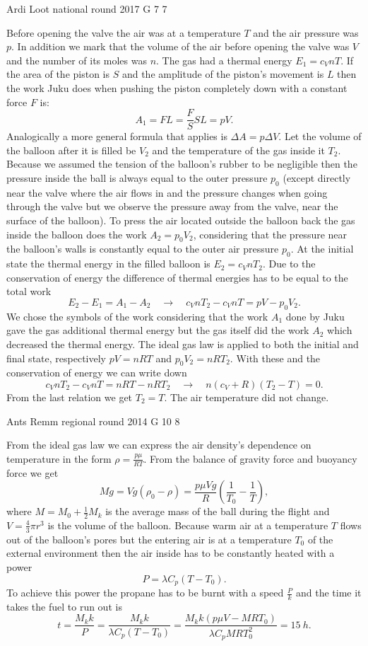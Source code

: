 \documentclass[11pt]{article}
\begin{document}
{Ardi Loot} %
{national round} %
{2017} %
{G 7} %
{7} %
{

\ifEngSolution
Before opening the valve the air was at a temperature $T$ and the air pressure was $p$. In addition we mark that the volume of the air before opening the valve was $V$ and the number of its moles was $n$. The gas had a thermal energy $E_1=c_VnT$. If the area of the piston is $S$ and the amplitude of the piston’s movement is $L$ then the work Juku does when pushing the piston completely down with a constant force $F$ is:
$$A_1=FL=\frac{F}{S}SL=pV.$$ 
Analogically a more general formula that applies is $\Delta A = p \Delta V$. Let the volume of the balloon after it is filled be $V_2$ and the temperature of the gas inside it $T_2$. Because we assumed the tension of the balloon’s rubber to be negligible then the pressure inside the ball is always equal to the outer pressure $p_0$ (except directly near the valve where the air flows in and the pressure changes when going through the valve but we observe the pressure away from the valve, near the surface of the balloon). To press the air located outside the balloon back the gas inside the balloon does the work $A_2=p_0V_2$, considering that the pressure near the balloon’s walls is constantly equal to the outer air pressure $p_0$. At the initial state the thermal energy in the filled balloon is $E_2=c_VnT_2$. Due to the conservation of energy the difference of thermal energies has to be equal to the total work
$$E_2-E_1 = A_1-A_2 \quad\rightarrow\quad c_VnT_2-c_VnT = pV - p_0V_2.$$ 
We chose the symbols of the work considering that the work $A_1$ done by Juku gave the gas additional thermal energy but the gas itself did the work $A_2$ which decreased the thermal energy. The ideal gas law is applied to both the initial and final state, respectively $pV=nRT$ and $p_0V_2=nRT_2$. With these and the conservation of energy we can write down
$$c_VnT_2-c_VnT = nRT-nRT_2 \quad\rightarrow\quad n(c_V+R)(T_2-T)=0.$$ 
From the last relation we get $T_2=T$. The air temperature did not change.
\fi
}

{Ants Remm} %
{regional round} %
{2014} %
{G 10} %
{8} %
{

\ifEngSolution
From the ideal gas law we can express the air density’s dependence on temperature in the form $\rho = \frac{p \mu}{R T}$. From the balance of gravity force and buoyancy force we get
\[
M g = V g (\rho_0 - \rho) = \frac{p \mu V g}{R} (\frac{1}{T_0} - \frac{1}{T}),
\] 
where $M = M_0 + \frac{1}{2} M_k$ is the average mass of the ball during the flight and $V = \frac{4}{3} \pi r^3$ is the volume of the balloon. Because warm air at a temperature $T$ flows out of the balloon’s pores but the entering air is at a temperature $T_0$ of the external environment then the air inside has to be constantly heated with a power
\[
P = \lambda C_p (T - T_0).
\] 
To achieve this power the propane has to be burnt with a speed $\frac{P}{k}$ and the time it takes the fuel to run out is
\[
t = \frac{M_k k}{P} = \frac{M_k k}{\lambda C_p (T - T_0)} = \frac{M_k k (p \mu V - M R T_0)}{\lambda C_p M R T_0^2} = \SI{15}{h}.
\]
\fi
}
\end{document}
